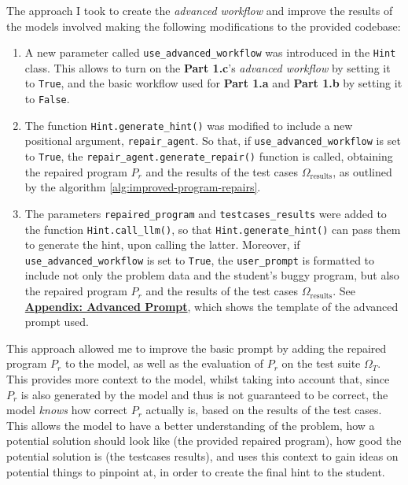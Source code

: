 \documentclass{article}
\begin{document}

The approach I took to create the \textit{advanced workflow} and improve the results of the models involved making the following modifications to the provided codebase:

\begin{enumerate}
    \item A new parameter called \texttt{use\_advanced\_workflow} was introduced in the \texttt{Hint} class. This allows to turn on the \textbf{Part 1.c}'s \textit{advanced workflow} by setting it to \texttt{True}, and the basic workflow used for \textbf{Part 1.a} and \textbf{Part 1.b} by setting it to \texttt{False}.
    \item The function \texttt{Hint.generate\_hint()} was modified to include a new positional argument, \texttt{repair\_agent}. So that, if \texttt{use\_advanced\_workflow} is set to \texttt{True}, the \texttt{repair\_agent.generate\_repair()} function is called, obtaining the repaired program $P_r$ and the results of the test cases $\Omega_{\text{results}}$, as outlined by the algorithm \ref{alg:improved-program-repairs}. 
    \item The parameters \texttt{repaired\_program} and \texttt{testcases\_results} were added to the function \texttt{Hint.call\_llm()}, so that \texttt{Hint.generate\_hint()} can pass them to generate the hint, upon calling the latter. Moreover, if \texttt{use\_advanced\_workflow} is set to \texttt{True}, the \texttt{user\_prompt} is formatted to include not only the problem data and the student's buggy program, but also the repaired program $P_r$ and the results of the test cases $\Omega_{\text{results}}$. See \hyperref[appendix:advanced-prompt]{\textbf{Appendix: Advanced Prompt}}, which shows the template of the advanced prompt used.
\end{enumerate}

This approach allowed me to improve the basic prompt by adding the repaired program $P_r$ to the model, as well as the evaluation of $P_r$ on the test suite $\Omega_T$. This provides more context to the model, whilst taking into account that, since $P_r$ is also generated by the model and thus is not guaranteed to be correct, the model \textit{knows} how correct $P_r$ actually is, based on the results of the test cases. This allows the model to have a better understanding of the problem, how a potential solution should look like (the provided repaired program), how good the potential solution is (the testcases results), and uses this context to gain ideas on potential things to pinpoint at, in order to create the final hint to the student.
\end{document}
